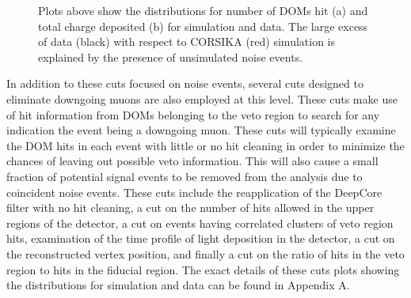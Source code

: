 \documentclass{gatech-thesis}
\begin{document}
\begin{figure}\label{fig:MicroHitAndCharge}
\centering
{}
\caption{Plots above show the distributions for number of DOMs hit (a) and total charge deposited (b) for simulation and data. The large excess of data (black) with respect to CORSIKA (red) simulation is explained by the presence of unsimulated noise events.} 
\end{figure}

In addition to these cuts focused on noise events, several cuts designed to eliminate downgoing muons are also employed at this level. These cuts make use of hit information from DOMs belonging to the veto region to search for any indication the event being a downgoing muon. These cuts will typically examine the DOM hits in each event with little or no hit cleaning in order to minimize the chances of leaving out possible veto information. This will also cause a small fraction of potential signal events to be removed from the analysis due to coincident noise events. These cuts include the reapplication of the DeepCore filter with no hit cleaning, a cut on the number of hits allowed in the upper regions of the detector, a cut on events having correlated clusters of veto region hits, examination of the time profile of light deposition in the detector, a cut on the reconstructed vertex position, and finally a cut on the ratio of hits in the veto region to hits in the fiducial region. The exact details of these cuts plots showing the distributions for simulation and data can be found in Appendix A.
\end{document}
